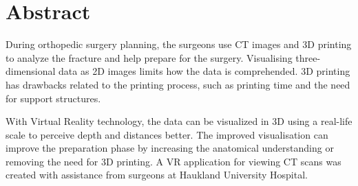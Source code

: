 \documentclass[a4paper]{report}
\begin{document}
%
%


\makeatletter
{}
\def\lst@SkipToFirst{%
    \lst@ifmatchrangestart\c@lstnumber=\numexpr-1+\lst@firstline\fi
    \ifnum \lst@lineno<\lst@firstline
        \def\lst@next{\lst@BeginDropInput\lst@Pmode
        \lst@Let{13}\lst@MSkipToFirst
        \lst@Let{10}\lst@MSkipToFirst}%
        \expandafter\lst@next
    \else
        \expandafter\lst@BOLGobble
    \fi}
\makeatother



\titlePage
\pagebreak

\section*{Abstract}
During orthopedic surgery planning, the surgeons use CT images and 3D printing to analyze the fracture and help prepare for the surgery.
Visualising three-dimensional data as 2D images limits how the data is comprehended. 3D printing has drawbacks related to the printing process, such as printing time and the need for support structures.

With Virtual Reality technology, the data can be visualized in 3D using a real-life scale to perceive depth and distances better. The improved visualisation can improve the preparation phase by increasing the anatomical understanding or removing the need for 3D printing.
A VR application for viewing CT scans was created with assistance from surgeons at Haukland University Hospital.
\end{document}
